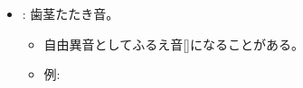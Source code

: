 \begin{itemize}
    
    \item \textbf{}: 歯茎たたき音。
    \begin{itemize}
        \item 自由異音としてふるえ音[]になることがある。
        \item 例: %
    \end{itemize}
\end{itemize}